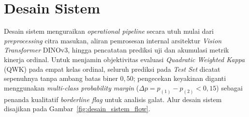 \section{Desain Sistem}
\label{sec:desain_sistem}

Desain sistem menguraikan \textit{operational pipeline} secara utuh mulai dari \textit{preprocessing} citra masukan, aliran pemrosesan internal arsitektur \textit{Vision Transformer} DINOv3, hingga pencatatan prediksi uji dan akumulasi metrik kinerja ordinal. Untuk menjamin objektivitas evaluasi \textit{Quadratic Weighted Kappa} (QWK) pada empat kelas ordinal, seluruh prediksi pada \textit{Test Set} dicatat sepenuhnya tanpa ambang batas biner $0,50$; pengecekan keyakinan diganti menggunakan \textit{multi-class probability margin} ($\Delta p = p_{(1)} - p_{(2)} < 0,15$) sebagai penanda kualitatif \textit{borderline flag} untuk analisis galat. Alur desain sistem disajikan pada Gambar~\ref{fig:desain_sistem_flow}.

